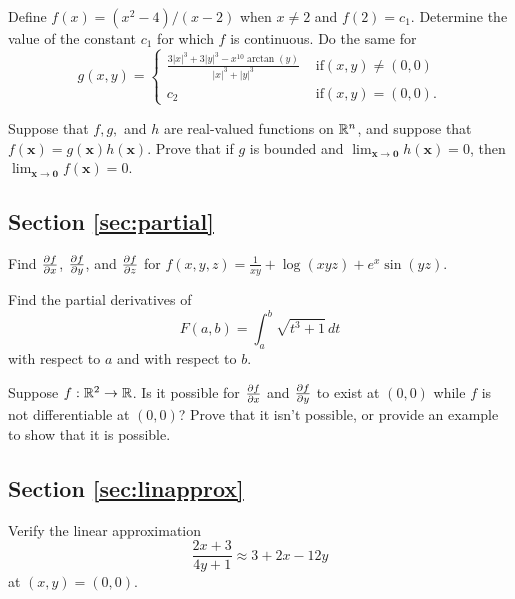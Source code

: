 \documentclass[svgnames]{watsonbook}
\begin{document}
\begin{exercise}{}{}
  Define $f(x) = (x^2 - 4)/(x-2)$ when $x\neq 2$ and $f(2) =
  c_1$. Determine the value of the constant $c_1$ for which $f$ is
  continuous. Do the same for
  \[
    g(x,y) = \left\{
      \begin{array}{cl}
        \frac{3|x|^3+3|y|^3-x^{10}\arctan(y)}{|x|^3+|y|^3} & \text{ if}(x,y)\neq (0,0) \\
        c_2 & \text{ if}(x,y)=(0,0).
      \end{array} 
    \right.
  \]
\end{exercise}

\begin{exercise}{}{}
  Suppose that $f,g,$ and $h$ are real-valued functions on $\mathbb{R}^n$, and
  suppose that $f(\mathbf{x}) = g(\mathbf{x})h(\mathbf{x})$. Prove that if $g$
  is bounded and $\lim_{\mathbf{x}\to \mathbf{0}}h(\mathbf{x}) = 0$, then
  $\lim_{\mathbf{x}\to \mathbf{0}}f(\mathbf{x}) = 0$.
\end{exercise}

\subsection*{Section \ref{sec:partial}}

\begin{exercise}{}{}
  Find $\frac{\partial f}{\partial x}$, $\frac{\partial f}{\partial y}$, and $\frac{\partial f}{\partial z}$ for
  $f(x,y,z) = \frac{1}{xy} + \log(xyz) + e^x\sin(y z) $.
\end{exercise}

\begin{exercise}{}{}
  Find the partial derivatives of
  \[
    F(a,b) = \int_a^b \sqrt{t^3+1}\,dt
  \]
  with respect to $a$ and with respect to $b$.
\end{exercise}


\begin{exercise}{}{}
  Suppose $f:\mathbb{R}^2 \to \mathbb{R}$. Is it possible for $\frac{\partial f}{\partial x}$ and
  $\frac{\partial f}{\partial y}$ to exist at $(0,0)$ while $f$ is not differentiable at
  $(0,0)$?  Prove that it isn't possible, or provide an example to
  show that it is possible.
\end{exercise}

\subsection*{Section \ref{sec:linapprox}}

\begin{exercise}{}{}
  Verify the linear approximation
  \[
    \frac{2x+3}{4y+1} \approx 3 + 2x - 12y
  \]
  at $(x,y) = (0,0)$.
\end{exercise}
\end{document}
